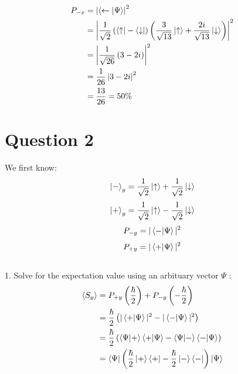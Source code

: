 \documentclass[12pt]{article}
\begin{document}
\begin{equation}
    \begin{split}
        P_{-x} &= \left|\braket{ \leftarrow | \Psi}\right|^{2} \\
        &= \left|\frac{1}{\sqrt{2}}\left(\bra{\uparrow}-\bra{\downarrow}\right)
        \left(\frac{3}{\sqrt{13}}\ket{\uparrow}+\frac{2i}{\sqrt{13}}\ket{\downarrow}\right)\right|^2 \\
        &= \left|\frac{1}{\sqrt{26}}\left(3 - 2i\right)\right|^2 \\
        &= \frac{1}{26}\left|3-2i\right|^2 \\
        &= \frac{13}{26} = 50\% \\
    \end{split}
\end{equation}



\newpage
\section*{Question 2}
We first know:
\begin{equation}
    \ket{-}_{y} = \frac{1}{\sqrt2}\ket{\uparrow} + \frac{1}{\sqrt2}\ket{\downarrow}
\end{equation}
\begin{equation}
    \ket{+}_{y} = \frac{1}{\sqrt2}\ket{\uparrow} - \frac{1}{\sqrt2}\ket{\downarrow}    
\end{equation}
\begin{equation}
    P_{-y} = |\braket{-|\Psi}|^2    
\end{equation}
\begin{equation}
    P_{+y} = |\braket{+|\Psi}|^2 
\end{equation} \\

1. Solve for the expectation value using an arbituary vector $\Psi$ :
\begin{equation}
    \begin{split}
        \braket{S_y} &= P_{+y}\left(\frac{\hbar}{2}\right)  + P_{-y}\left(-\frac{\hbar}{2}\right) \\
        &= \frac{\hbar}{2}\left( |\braket{+|\Psi}|^2 - |\braket{-|\Psi}|^2\right) \\
        &= \frac{\hbar}{2}\left( \braket{\Psi|+}\braket{+|\Psi} - \braket{\Psi|-}\braket{-|\Psi}\right) \\
        &= \bra{\Psi}\left(\frac{\hbar}{2}\ket{+}\bra{+} - \frac{\hbar}{2}\ket{-}\bra{-}\right)\ket{\Psi} \\
    \end{split}
\end{equation}
\end{document}
